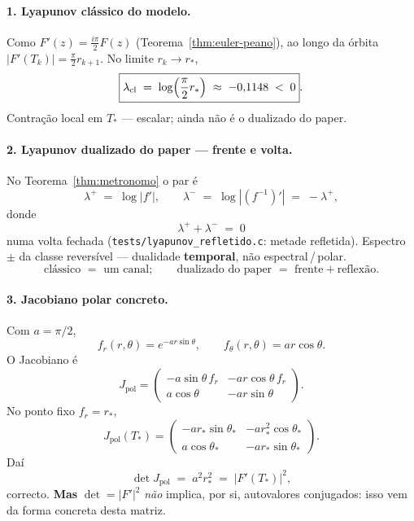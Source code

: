 \documentclass[11pt,a4paper]{article}
\newcommand{\code}[1]{\texttt{#1}}
\begin{document}
\paragraph{1. Lyapunov clássico do modelo.}
Como $F'(z)=\frac{i\pi}{2}F(z)$ (Teorema~\ref{thm:euler-peano}),
ao longo da órbita $|F'(T_k)|=\frac{\pi}{2}r_{k+1}$. No limite
$r_k\to r_{\ast}$,
\[
\boxed{
\lambda_{\mathrm{cl}}
\;=\;
\log\Bigl(\frac{\pi}{2}r_{\ast}\Bigr)
\;\approx\;
-0{,}1148
\;<\;0
}.
\]
Contração local em $T_{\ast}$ --- escalar; ainda não é o dualizado do
paper.

\paragraph{2. Lyapunov dualizado do paper --- frente e volta.}
No Teorema~\ref{thm:metronomo} o par é
\[
\boxed{\lambda^{+} \;=\; \log|f'|,\qquad
\lambda^{-} \;=\; \log|(f^{-1})'| \;=\; -\lambda^{+}},
\]
donde
\[
\boxed{\lambda^{+} + \lambda^{-} \;=\; 0}
\]
numa volta fechada (\code{tests/lyapunov\_refletido.c}: metade
refletida). Espectro $\pm$ da classe reversível --- dualidade
\textbf{temporal}, não espectral\,/\,polar.
\[
\boxed{
\text{clássico }=\text{ um canal};
\qquad
\text{dualizado do paper }=\text{ frente}+\text{reflexão}.
}
\]

\paragraph{3. Jacobiano polar concreto.}
Com $a=\pi/2$,
\[
\boxed{
f_r(r,\theta)=e^{-a r\sin\theta},
\qquad
f_{\theta}(r,\theta)=a r\cos\theta.
}
\]
O Jacobiano é
\[
J_{\mathrm{pol}}
=
\begin{pmatrix}
-a\sin\theta\,f_r & -a r\cos\theta\,f_r \\
a\cos\theta & -a r\sin\theta
\end{pmatrix}.
\]
No ponto fixo $f_r=r_{\ast}$,
\[
\boxed{
J_{\mathrm{pol}}(T_{\ast})
=
\begin{pmatrix}
-a r_{\ast}\sin\theta_{\ast} & -a r_{\ast}^{2}\cos\theta_{\ast} \\
a\cos\theta_{\ast} & -a r_{\ast}\sin\theta_{\ast}
\end{pmatrix}.
}
\]
Daí
\[
\boxed{\det J_{\mathrm{pol}} \;=\; a^{2}r_{\ast}^{2} \;=\; |F'(T_{\ast})|^{2}},
\]
correcto. \textbf{Mas} $\det=|F'|^{2}$ \emph{não} implica, por si,
autovalores conjugados: isso vem da forma concreta desta matriz.
\end{document}
